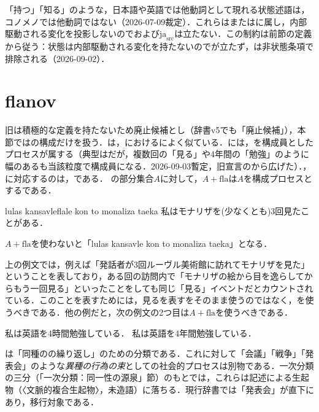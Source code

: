 \documentclass[../../main-detail.tex]{subfiles}
\begin{document}
\begin{remark}[状態他動詞]
「持つ」「知る」のような，日本語や英語では他動詞として現れる状態述語は，コノメノでは他動詞ではない（2026-07-09裁定）．これらはまたはに属し，内部駆動される変化を投影しないのでおよび$\mathrm{ja}_{\mathrm{src}}$は立たない．この制約は前節の定義から従う：状態は内部駆動される変化を持たないのでが立たず，は非状態条項で排除される（2026-09-02）．
\end{remark}

\section{flanov}
旧は積極的な定義を持たないため廃止候補とし（辞書v5でも「廃止候補」），本節ではの構成だけを扱う．は，におけるによく似ている．には，を構成員としたプロセスが属する（典型はだが，複数回の「見る」や4年間の「勉強」のように幅のあるも当該粒度で構成員になる．2026-09-03暫定，旧宣言のから広げた）．，に対応するのは，である．
の部分集合$A$に対して，$A+\text{fla}$は$A$を構成プロセスとするである．
\begin{exe}
    \ex lulas kansavleflale kon to monaliza taeka
    \glt 私はモナリザを(少なくとも)3回見たことがある．
\end{exe}
\begin{remark}$A+\text{fla}$を使わないと「lulas kansavle kon to monaliza taeka」となる．
\end{remark}
上の例文では，例えば「発話者が3回ルーヴル美術館に訪れてモナリザを見た」ということを表しており，ある回の訪問内で「モナリザの絵から目を逸らしてからもう一回見る」といったことをしても同じ「見る」イベントだとカウントされている．このことを表すためには，見るを表すをそのまま使うのではなく，を使うべきである．他の例だと，次の例文の2つ目は$A+\text{fla}$を使うべきである．
\begin{exe}
\ex 私は英語を4時間勉強している．
\ex 私は英語を4年間勉強している．
\end{exe}

\begin{araidashi}
    \item {}は「同種のの繰り返し」のための分類である．これに対して「会議」「戦争」「発表会」のような\emph{異種の行為の束}としての社会的プロセスは別物である．一次分類の三分（「一次分類：同一性の源泉」節）のもとでは，これらは記述による生起物（〈文脈的複合生起物〉，未造語）に落ちる．現行辞書では「発表会」が直下にあり，移行対象である．
\end{araidashi}
\end{document}
